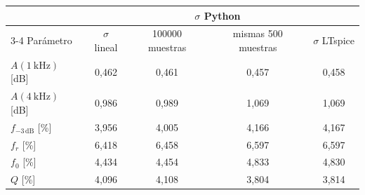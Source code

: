 \begin{tabular}{@{}lcccc@{}}
\toprule
& & \multicolumn{2}{c}{$\sigma$ Python} & \\ \cmidrule(lr){3-4} Parámetro & $\sigma$ lineal & \num{100000} muestras & mismas \num{500} muestras & $\sigma$ LTspice \\
\midrule
$A(\qty{1}{\kilo\hertz})$ [dB] & 0{,}462 & 0{,}461 & 0{,}457 & 0{,}458 \\
$A(\qty{4}{\kilo\hertz})$ [dB] & 0{,}986 & 0{,}989 & 1{,}069 & 1{,}069 \\
$f_{-3\,\text{dB}}$ [\%] & 3{,}956 & 4{,}005 & 4{,}166 & 4{,}167 \\
$f_r$ [\%] & 6{,}418 & 6{,}458 & 6{,}597 & 6{,}597 \\
$f_0$ [\%] & 4{,}434 & 4{,}454 & 4{,}833 & 4{,}830 \\
$Q$ [\%] & 4{,}096 & 4{,}108 & 3{,}804 & 3{,}814 \\
\bottomrule
\end{tabular}
